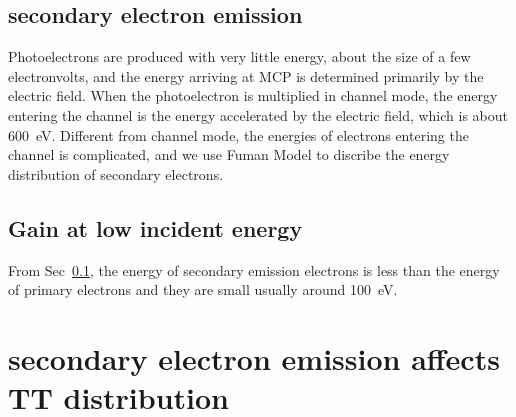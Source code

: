 \documentclass{article}
\begin{document}
\subsection{secondary electron emission}\label{subsec:fuman}
Photoelectrons are produced with very little energy, about the size of a few electronvolts, and the energy arriving at MCP is determined primarily by the electric field.
When the photoelectron is multiplied in channel mode, the energy entering the channel is the energy accelerated by the electric field, which is about \SI{600}{eV}.
Different from channel mode, the energies of electrons entering the channel is complicated,
and we use Fuman Model to discribe the energy distribution of secondary electrons\cite{2002Probabilistic}.

\subsection{Gain at low incident energy}\label{sec:gain}
From Sec~\ref{subsec:fuman}, the energy of secondary emission electrons is less than the energy of primary electrons and
they are small usually around \SI{100}{eV}.


\section{secondary electron emission affects TT distribution}\label{sec:TT}
\newpage


\end{document}
